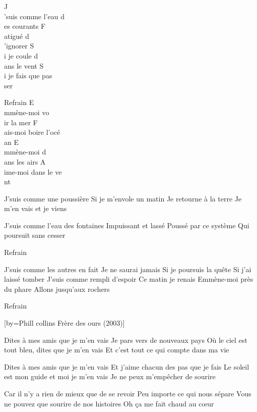 \beginverse
J\\[Lam]’suis comme l’eau d\\[Sol]es courants
F\\[lam]atigué d\\[Sol]’ignorer
S\\[Lam]i je coule d\\[Sol]ans le vent
S\\[Do]i je fais que pas\\[Sol]ser
\endverse

\beginverse
Refrain
E\\[Rém]mmène-moi vo\\[Lam]ir la mer
F\\[Mi]ais-moi boire l’océ\\[Lam]an
E\\[Rém]mmène-moi d\\[Lam]ans les airs
A\\[Mi]ime-moi dans le ve\\[Lam]nt
\\[bis]
\endverse

\beginverse
J’suis comme une poussière
Si je m’envole un matin
Je retourne à la terre
Je m’en vais et je viens
\endverse

\beginverse
J’suis comme l’eau des fontaines
Impuissant et lassé
Poussé par ce système
Qui poursuit sans cesser
\endverse

\beginverse
Refrain
\endverse

\beginverse
J’suis comme les autres en fait
Je ne saurai jamais
Si je poursuis la quête
Si j’ai laissé tomber
J’suis comme rempli d’espoir
Ce matin je renais
Emmène-moi près du phare
Allons jusqu’aux rochers
\endverse

\beginverse
Refrain
\endverse

[by={Phill collins \- Frère des ours (2003)}]

\beginverse
Dites à mes amis que je m'en vais
Je pars vers de nouveaux pays
Où le ciel est tout bleu, dites que je m'en vais
Et c'est tout ce qui compte dans ma vie
\endverse

\beginverse
Dites à mes amis que je m'en vais
Et j'aime chacun des pas que je fais
Le soleil est mon guide et moi je m'en vais
Je ne peux m'empêcher de sourire
\endverse

\beginverse
Car il n'y a rien de mieux que de se revoir
Peu importe ce qui nous sépare
Vous ne pouvez que sourire de nos histoires
Oh ça me fait chaud au cœur
\endverse

